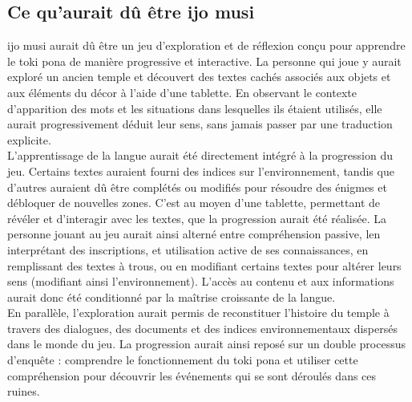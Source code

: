 \documentclass{scrartcl}
\begin{document}
	\subsection*{Ce qu'aurait dû être ijo musi}
	ijo musi aurait dû être un jeu d’exploration et de réflexion conçu pour apprendre le toki pona de manière progressive et interactive. La personne qui joue y aurait exploré un ancien temple et découvert des textes cachés associés aux objets et aux éléments du décor à l’aide d’une tablette. En observant le contexte d’apparition des mots et les situations dans lesquelles ils étaient utilisés, elle aurait progressivement déduit leur sens, sans jamais passer par une traduction explicite.\\
	L’apprentissage de la langue aurait été directement intégré à la progression du jeu. Certains textes auraient fourni des indices sur l’environnement, tandis que d’autres auraient dû être complétés ou modifiés pour résoudre des énigmes et débloquer de nouvelles zones. C'est au moyen d'une tablette, permettant de révéler et d'interagir avec les textes, que la progression aurait été réalisée. La personne jouant au jeu aurait ainsi alterné entre compréhension passive, len interprétant des inscriptions, et utilisation active de ses connaissances, en remplissant des textes à trous, ou en modifiant certains textes pour altérer leurs sens (modifiant ainsi l'environnement). L’accès au contenu et aux informations aurait donc été conditionné par la maîtrise croissante de la langue.\\
	En parallèle, l’exploration aurait permis de reconstituer l’histoire du temple à travers des dialogues, des documents et des indices environnementaux dispersés dans le monde du jeu. La progression aurait ainsi reposé sur un double processus d’enquête : comprendre le fonctionnement du toki pona et utiliser cette compréhension pour découvrir les événements qui se sont déroulés dans ces ruines.
	
\end{document}
